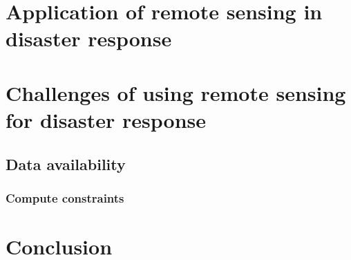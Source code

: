 \documentclass[conference,a4paper]{IEEEtran}
\begin{document}
\section{Application of remote sensing in disaster response}


\section{Challenges of using remote sensing for disaster response}

\subsection{Data availability}


\subsubsection{Compute constraints}


\section{Conclusion}




  
\end{document}

